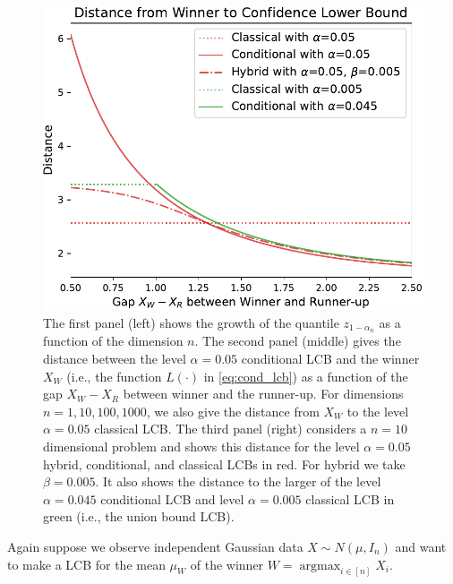 \documentclass{article}
\DeclareMathOperator*{\argmax}{argmax}
\begin{document}
\begin{figure}
{\begin{minipage}{0.33\textwidth}
    \end{minipage}
    \hfill
    \hspace{0.01\textwidth}
    \begin{minipage}{0.33\textwidth}
        \centering
        \includegraphics[width=\textwidth]{fig/hyb_dist_to_winner.pdf}
    \end{minipage}
    }
    \caption{ The first panel (left) shows the growth of the quantile $z_{1 - \alpha_n}$ as a function of the dimension $n$. The second panel (middle) gives the distance between the level $\alpha=0.05$ conditional LCB and the winner $X_W$ (i.e., the function $L(\cdot)$ in \eqref{eq:cond_lcb}) as a function of the gap $X_{W} - X_{R}$ between winner and the runner-up. For dimensions $n=1,10,100,1000$, we also give the distance from $X_W$ to the level $\alpha=0.05$ classical LCB. The third panel (right) considers a $n=10$ dimensional problem and shows this distance for the level $\alpha=0.05$ hybrid, conditional, and classical LCBs in red. For hybrid we take $\beta=0.005$. It also shows the distance to the larger of the level $\alpha=0.045$ conditional LCB and level $\alpha=0.005$ classical LCB in green (i.e., the union bound LCB).}
    \label{fig:lcb}
\end{figure}

Again suppose we observe independent Gaussian data $X \sim N(\mu, I_n)$ and want to make a LCB for the mean $\mu_W$ of the winner $W = \argmax_{i \in [n]} X_i$. 
\end{document}
